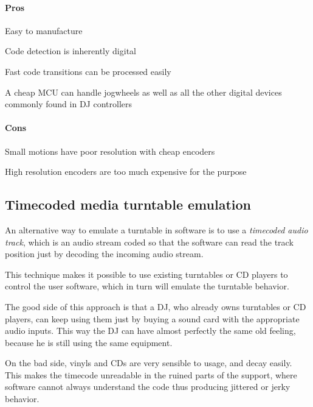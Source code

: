 \documentclass[a4paper,10pt]{article}
\begin{document}
\begin{multicols}{2}
\paragraph{Pros}
\begin{itemize*}
	\item Easy to manufacture
	\item Code detection is inherently digital
	\item Fast code transitions can be processed easily
	\item A cheap MCU can handle jogwheels as well as all the other digital
		devices commonly found in DJ controllers
\end{itemize*}


\paragraph{Cons}
\begin{itemize*}
	\item Small motions have poor resolution with cheap encoders
	\item High resolution encoders are too much expensive for the purpose
\end{itemize*}


\subsection{Timecoded media turntable emulation}

An alternative way to emulate a turntable in software is to use a
\emph{timecoded audio track}, which is an audio stream coded so that the
software can read the track position just by decoding the incoming audio
stream.

This technique makes it possible to use existing turntables or CD players to
control the user software, which in turn will emulate the turntable behavior.

The good side of this approach is that a DJ, who already owns turntables or CD
players, can keep using them just by buying a sound card with the appropriate
audio inputs. This way the DJ can have almost perfectly the same old feeling,
because he is still using the same equipment.

On the bad side, vinyls and CDs are very sensible to usage, and decay easily.
This makes the timecode unreadable in the ruined parts of the support, where
software cannot always understand the code thus producing jittered or jerky
behavior.


\end{multicols}
\end{document}
